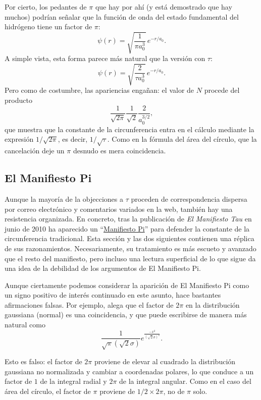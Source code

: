 Por cierto, los pedantes de $\pi$ que hay por ahí (y está demostrado que hay muchos) podrían señalar que la función de onda del estado fundamental del hidrógeno tiene un factor de $\pi$:
\[
\psi(r) = \sqrt{\frac{1}{\pi a_0^3}}\,e^{-r/a_0}.
\]
A simple vista, esta forma parece más natural que la versión con $\tau$:
\[
\psi(r) = \sqrt{\frac{2}{\tau a_0^3}}\,e^{-r/a_0}.
\]
Pero como de costumbre, las apariencias engañan: el valor de $N$ procede del producto
\[
\frac{1}{\sqrt{2\pi}} \frac{1}{\sqrt{2}} \frac{2}{a_0^{3/2}},
\]
que muestra que la constante de la circunferencia entra en el cálculo mediante la expresión $1/\sqrt{2\pi}$, es decir, $1/\sqrt{\tau}$. Como en la fórmula del área del círculo, que la cancelación deje un $\pi$ desnudo es mera coincidencia.



  \subsection{El Manifiesto Pi} %
  \label{sec:the_pi_manifesto_a_rebuttal}

Aunque la mayoría de la objecciones a $\tau$ proceden de correspondencia dispersa por correo electrónico y comentarios variados en la web, también hay una resistencia organizada. En concreto, tras la publicación de \emph{El Manifiesto Tau} en junio de 2010 ha aparecido un ``\href{http://www.thepimanifesto.com/}{Manifiesto Pi}'' para defender la constante de la circunferencia tradicional. Esta sección y las dos siguientes contienen una réplica de sus razonamientos. Necesariamente, su tratamiento es más escueto y avanzado que el resto del manifiesto, pero incluso una lectura superficial de lo que sigue da una idea de la debilidad de los argumentos de El Manifiesto Pi.

Aunque ciertamente podemos considerar la aparición de El Manifiesto Pi como un signo positivo de interés continuado en este asunto, hace bastantes afirmaciones falsas. Por ejemplo, alega que el factor de $2\pi$ en la distribución gaussiana (normal) es una coincidencia, y que puede escribirse de manera más natural como
\[
\frac{1}{\sqrt\pi(\sqrt 2\sigma)}e^{\frac{-x^2}{(\sqrt 2\sigma)^2}}.
\]

Esto es falso: el factor de $2\pi$ proviene de elevar al cuadrado la distribución gaussiana no normalizada y cambiar a coordenadas polares, lo que conduce a un factor de $1$ de la integral radial y  $2\pi$ de la integral angular. Como en el caso del área del círculo, el factor de $\pi$ proviene de $1/2\times 2\pi$, no de $\pi$ solo.

